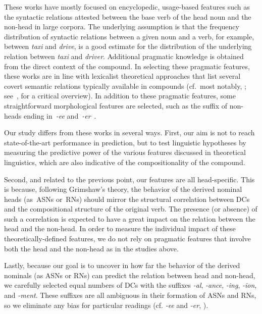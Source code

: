 \documentclass[output=paper]{langsci/langscibook}
\begin{document}
These works have mostly focused on encyclopedic, usage-based features such as the syntactic relations attested between the base verb of the head noun 
and the non-head in large corpora. The underlying assumption is that the frequency distribution of syntactic relations between a given noun and a verb, for example, between \textit{taxi} and \textit{drive}, is a good estimate for the distribution of the underlying relation between \textit{taxi} and \textit{driver}. Additional pragmatic knowledge is obtained  from the direct context of the compound.
In selecting these pragmatic features, these works are in line with lexicalist theoretical approaches that list several covert semantic relations typically available in compounds (cf.\ most notably, \citealt{levi:78}; see~\citealt{fokkens:07}, for a critical overview). In addition to these pragmatic features, some 
straightforward morphological features are selected, such as the suffix of non-heads ending in~\textit{-ee} and~\textit{-er}~\citep{lapata:02}.

Our study differs from these works in several ways. First, our aim is not to reach state-of-the-art performance in prediction, but to  {test linguistic hypotheses by} measuring the predictive power of the various features discussed in theoretical linguistics, which are also indicative of the  {compositionality} of the compound. 

Second, and related to the previous point, our features are all head-specific. This is because,  following Grimshaw's theory, the behavior of the derived nominal heads (as~ASNs or~RNs) should mirror the structural correlation between DCs and the compositional structure of the original verb. The presence (or absence) of such a correlation is expected to have a great impact on the relation between the head and the non-head. In order to measure the individual impact of these theoretically-defined features, we do not rely on pragmatic features  {that involve both the head and the non-head} as in the studies above.
 

Lastly, because our goal is to uncover in how far the behavior of the derived nominals (as ASNs or RNs) can  predict the relation between head and non-head, we carefully selected  {equal numbers} of DCs with the suffixes \textit{-al}, \textit{-ance},  \textit{-ing},  \textit{-ion}, and  \textit{-ment}. These suffixes are all ambiguous in their formation of ASNs and RNs, so we eliminate any bias for particular readings (cf. \textit{-ee} and \textit{-er}, ).
\end{document}
